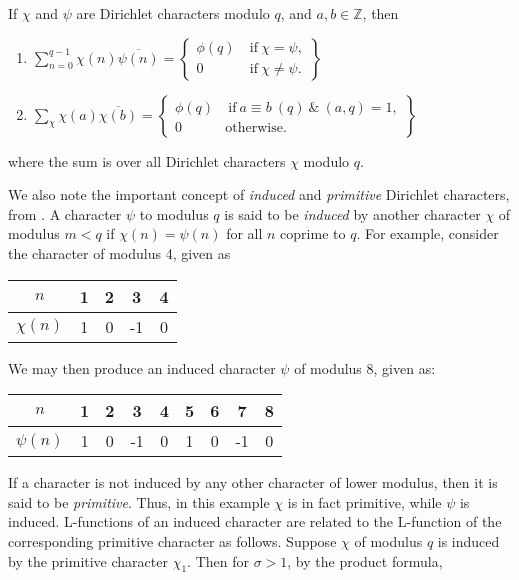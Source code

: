 \begin{proposition}
\label{OrthogonalityRelations}
If $\chi$ and $\psi$ are Dirichlet characters modulo $q$, and $a, b \in \mathbb{Z}$, then
\begin{enumerate}
    \item $\sum_{n=0}^{q-1} \chi(n)\overline{\psi(n)} = \left\{\begin{array}{cc}
        \phi(q) & \ \textrm{if} \ \chi=\psi, \\
        0 & \ \textrm{if} \ \chi \neq \psi.
    \end{array}\right\} $
    \item $\sum_{\chi}\chi(a)\overline{\chi(b)} = \left\{\begin{array}{cc}
       \phi(q)  & \ \textrm{if} \  a \equiv b \ (q) \ \& \ (a, q) = 1,\\
        0 & \textrm{otherwise}.
    \end{array} \right\}$
\end{enumerate}
where the sum is over all Dirichlet characters $\chi$ modulo $q$.
\end{proposition}
We also note the important concept of \textit{induced} and \textit{primitive} Dirichlet characters, from \cite[Chapter~11]{heath-brown_2005}. A character $\psi$ to modulus $q$ is said to be \textit{induced} by another character $\chi$ of modulus $m < q$ if $\chi(n) = \psi(n)$ for all $n$ coprime to $q$. For example, consider the character of modulus 4, given as
\begin{center}
    \begin{tabular}{c|c c c c}
        $n$ &  1 & 2 & 3 & 4\\
        \hline
        $\chi(n)$ & 1 & 0 & -1 & 0
    \end{tabular}
\end{center}
We may then produce an induced character $\psi$ of modulus 8, given as:
\begin{center}
    \begin{tabular}{c|c c c c c c c c}
        $n$ & 1 & 2 & 3 & 4 & 5 & 6 & 7 & 8\\
        \hline
        $\psi(n)$ & 1 & 0 & -1 & 0 & 1 & 0 & -1 & 0
    \end{tabular}
\end{center}
If a character is not induced by any other character of lower modulus, then it is said to be \textit{primitive}. Thus, in this example $\chi$ is in fact primitive, while $\psi$ is induced. L-functions of an induced character are related to the L-function of the corresponding primitive character as follows. Suppose $\chi$ of modulus $q$ is induced by the primitive character $\chi_1$. Then for $\sigma > 1$, by the product formula,
